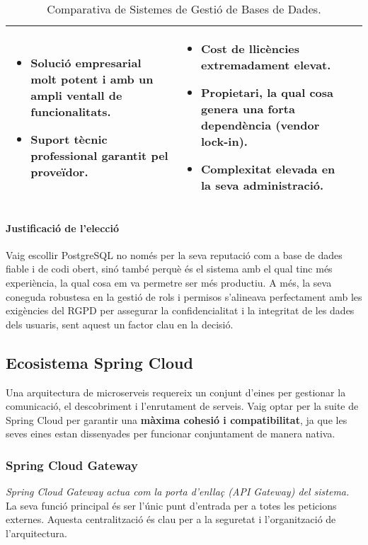\begin{table}[h]
\begin{tabular}{|l|p{4.5cm}|p{4.5cm}|}
\begin{itemize}
    \item Solució empresarial molt potent i amb un ampli ventall de funcionalitats.
    \item Suport tècnic professional garantit pel proveïdor.
\end{itemize} & 
\begin{itemize}
    \item Cost de llicències extremadament elevat.
    \item Propietari, la qual cosa genera una forta dependència (vendor lock-in).
    \item Complexitat elevada en la seva administració.
\end{itemize} \\
\hline
\end{tabular}
\caption{Comparativa de Sistemes de Gestió de Bases de Dades.}
\label{tab:sgbd_comparison}
\end{table}

\paragraph{Justificació de l'elecció}
Vaig escollir PostgreSQL no només per la seva reputació com a base de dades fiable i de codi obert, sinó també perquè és el sistema amb el qual tinc més experiència, la qual cosa em va permetre ser més productiu. A més, la seva coneguda robustesa en la gestió de rols i permisos s'alineava perfectament amb les exigències del RGPD per assegurar la confidencialitat i la integritat de les dades dels usuaris, sent aquest un factor clau en la decisió.

\subsection{Ecosistema Spring Cloud}
Una arquitectura de microserveis requereix un conjunt d'eines per gestionar la comunicació, el descobriment i l'enrutament de serveis. Vaig optar per la suite de Spring Cloud per garantir una \textbf{màxima cohesió i compatibilitat}, ja que les seves eines estan dissenyades per funcionar conjuntament de manera nativa.

\subsubsection{Spring Cloud Gateway}
\textit{Spring Cloud Gateway actua com la porta d'enllaç (API Gateway) del sistema.} La seva funció principal és ser l'únic punt d'entrada per a totes les peticions externes. Aquesta centralització és clau per a la seguretat i l'organització de l'arquitectura.

